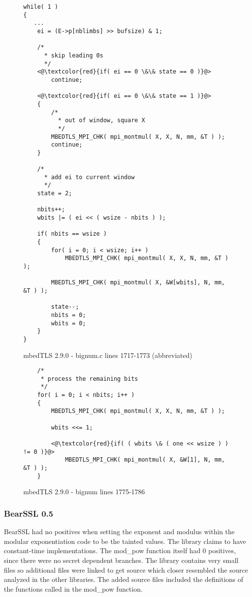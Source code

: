 \begin{figure}[h!]
\begin{lstlisting}
while( 1 )
{
   ...
    ei = (E->p[nblimbs] >> bufsize) & 1;

    /*
      * skip leading 0s
      */
    <@\textcolor{red}{if( ei == 0 \&\& state == 0 )}@>
        continue;

    <@\textcolor{red}{if( ei == 0 \&\& state == 1 )}@>
    {
        /*
          * out of window, square X
          */
        MBEDTLS_MPI_CHK( mpi_montmul( X, X, N, mm, &T ) );
        continue;
    }

    /*
      * add ei to current window
      */
    state = 2;

    nbits++;
    wbits |= ( ei << ( wsize - nbits ) );

    if( nbits == wsize )
    {
        for( i = 0; i < wsize; i++ )
            MBEDTLS_MPI_CHK( mpi_montmul( X, X, N, mm, &T ) );

        MBEDTLS_MPI_CHK( mpi_montmul( X, &W[wbits], N, mm, &T ) );

        state--;
        nbits = 0;
        wbits = 0;
    }
}
\end{lstlisting}
\caption{mbedTLS 2.9.0 - bignum.c lines 1717-1773 (abbreviated)}
\label{mbedtls:squareonzero}
\end{figure}

\begin{figure}
  \begin{lstlisting}
    /*
     * process the remaining bits
     */
    for( i = 0; i < nbits; i++ )
    {
        MBEDTLS_MPI_CHK( mpi_montmul( X, X, N, mm, &T ) );

        wbits <<= 1;

        <@\textcolor{red}{if( ( wbits \& ( one << wsize ) ) != 0 )}@>
            MBEDTLS_MPI_CHK( mpi_montmul( X, &W[1], N, mm, &T ) );
    }
  \end{lstlisting}
  \caption{mbedTLS 2.9.0 - bignum lines 1775-1786}
  \label{mbedtls:wbitshighrisk}
\end{figure}

\subsubsection{BearSSL 0.5}
BearSSL had no positives when setting the exponent and modulus within the
modular exponentiation code to be the tainted values. The library claims to have
constant-time implementations\cite{BearSSLweb}. The mod\_pow function itself had 0 positives,
since there were no secret dependent branches. The library contains very small
files so additional files were linked to get source which closer resembled the
source analyzed in the other libraries. The added source files included the
definitions of the functions called in the mod\_pow function.

